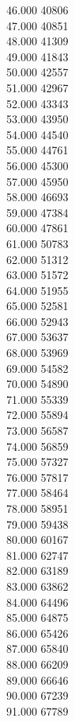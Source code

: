{ 46.000	40806 \\
 47.000	40851 \\
 48.000	41309 \\
 49.000	41843 \\
 50.000	42557 \\
 51.000	42967 \\
 52.000	43343 \\
 53.000	43950 \\
 54.000	44540 \\
 55.000	44761 \\
 56.000	45300 \\
 57.000	45950 \\
 58.000	46693 \\
 59.000	47384 \\
 60.000	47861 \\
 61.000	50783 \\
 62.000	51312 \\
 63.000	51572 \\
 64.000	51955 \\
 65.000	52581 \\
 66.000	52943 \\
 67.000	53637 \\
 68.000	53969 \\
 69.000	54582 \\
 70.000	54890 \\
 71.000	55339 \\
 72.000	55894 \\
 73.000	56587 \\
 74.000	56859 \\
 75.000	57327 \\
 76.000	57817 \\
 77.000	58464 \\
 78.000	58951 \\
 79.000	59438 \\
 80.000	60167 \\
 81.000	62747 \\
 82.000	63189 \\
 83.000	63862 \\
 84.000	64496 \\
 85.000	64875 \\
 86.000	65426 \\
 87.000	65840 \\
 88.000	66209 \\
 89.000	66646 \\
 90.000	67239 \\
 91.000	67789 \\
}
